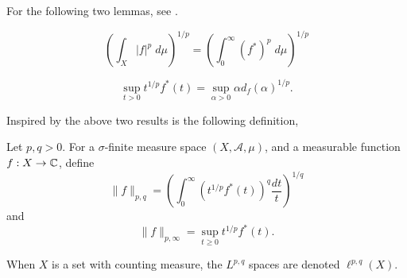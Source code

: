 For the following two lemmas, see \cite[Prop 1.1.4]{Grafakos1}.
\begin{lemma}
    \begin{equation*}
        \left(\int_X |f|^p\;d\mu\right)^{1/p} = \left(\int_0^\infty (f^*)^p\;d\mu\right)^{1/p}
    \end{equation*}
\end{lemma}
\begin{lemma}
    \begin{equation*}
        \sup_{t>0} t^{1/p}f^*(t) = \sup_{\alpha > 0} \alpha d_f(\alpha)^{1/p}.
    \end{equation*}
\end{lemma}

Inspired by the above two results is the following definition,
\begin{definition}
    Let $p,q > 0$. For a $\sigma$-finite measure space $(X,\mathcal{A},\mu)$, 
    and a measurable function $f:X\rightarrow \mathbb{C}$, define
    \begin{equation*}
        \|f\|_{p,q} = \left(\int_0^\infty (t^{1/p}f^*(t))^q\frac{dt}{t}\right)^{1/q}
    \end{equation*}
    and
    \begin{equation*}
        \|f\|_{p,\infty} = \sup_{t\geq 0} t^{1/p} f^*(t).
    \end{equation*}
\end{definition}

When $X$ is a set with counting measure, the $L^{p,q}$ spaces
are denoted $\ell^{p,q}(X)$. 

